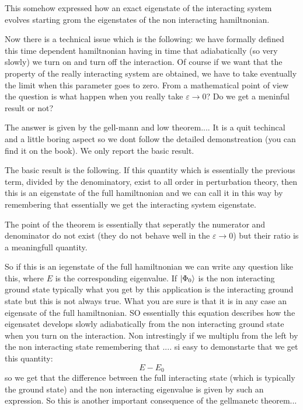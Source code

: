 \documentclass[../main/main.tex]{subfiles}
\begin{document}
This somehow expressed how an exact eigenstate of the interacting system evolves starting grom the eigenstates of the non interacting hamiltnonian.

Now there is a technical issue which is the following: we have formally defined this time dependent hamiltnonian having in time that adiabatically (so very slowly) we turn on and turn off the interaction. Of course if we want that the property of the really interacting system are obtained, we have to take eventually the limit when this parameter goes to zero. From a mathematical point of view the question is what happen when you really take \( \varepsilon \rightarrow 0 \)?
Do we get a meninful result or not?

The answer is given by the gell-mann and low theorem....
It is a quit techincal and a little boring aspect so we dont follow the detailed demonstreation (you can find it on the book). We only report the basic result.

The basic result is the following. If this quantity which is essentially the previous term, divided by the denominatory, exist to all order in perturbation theory, then this is an eigenstate of the full hamiltnonian and we can call it in this way by remembering that essentially we get the interacting system eigenstate.

The point of the theorem is essentially that seperatly the numerator and denominator do not exist (they do not behave well in the \( \varepsilon \rightarrow 0 \)) but their ratio is a meaningfull quantity.

So if this is an iegenstate of the full hamiltnonian we can write any question like this, where \( E \) is the corresponding eigenvalue. If \( \ket{\Phi _0}  \)  is the non interacting ground state typically what you get by this application is the interacting ground state but this is not always true.
What you are sure is that it is in any case an eigensate of the full hamiltnonian. SO essentially this equation describes how the eigensatet develops slowly adiabatically from the non interacting ground state when you turn on the interaction. Non intrestingly if we multiplu from the left by the non interacting state remembering that ....
si easy to demonstarte that we get this quantity:
\begin{equation}
  E- E_0
\end{equation}
so we get that the difference between the full interacting state (which is typically the ground state) and the non interacting eigenvalue is given by such an expression.
So this is another important consequence of the gellmanetc theorem...
\end{document}
